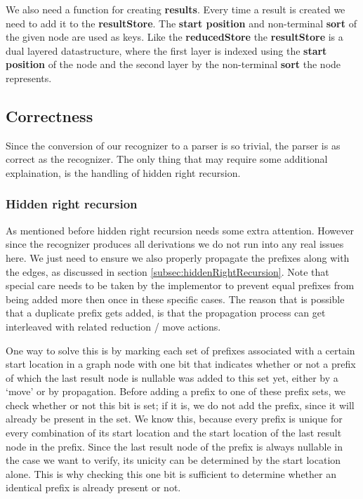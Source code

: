 \documentclass[a4paper,10pt]{article}
\begin{document}
We also need a function for creating {\bf results}. Every time a result is created we need to add it to the {\bf resultStore}. The {\bf start position} and non-terminal {\bf sort} of the given node are used as keys. Like the {\bf reducedStore} the {\bf resultStore} is a dual layered datastructure, where the first layer is indexed using the {\bf start position} of the node and the second layer by the non-terminal {\bf sort} the node represents.

\subsection{Correctness}
\label{sec:parserCorrectness}

Since the conversion of our recognizer to a parser is so trivial, the parser is as correct as the recognizer. The only thing that may require some additional explaination, is the handling of hidden right recursion.

\subsubsection{Hidden right recursion}
As mentioned before hidden right recursion needs some extra attention. However since the recognizer produces all derivations we do not run into any real issues here. We just need to ensure we also properly propagate the prefixes along with the edges, as discussed in section \ref{subsec:hiddenRightRecursion}. Note that special care needs to be taken by the implementor to prevent equal prefixes from being added more then once in these specific cases. The reason that is possible that a duplicate prefix gets added, is that the propagation process can get interleaved with related reduction / move actions.

One way to solve this is by marking each set of prefixes associated with a certain start location in a graph node with one bit that indicates whether or not a prefix of which the last result node is nullable was added to this set yet, either by a `move' or by propagation. Before adding a prefix to one of these prefix sets, we check whether or not this bit is set; if it is, we do not add the prefix, since it will already be present in the set. We know this, because every prefix is unique for every combination of its start location and the start location of the last result node in the prefix. Since the last result node of the prefix is always nullable in the case we want to verify, its unicity can be determined by the start location alone. This is why checking this one bit is sufficient to determine whether an identical prefix is already present or not.
\end{document}
